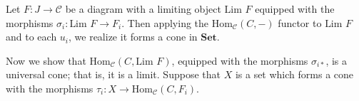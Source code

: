     \begin{prf}
        Let $F: J \to \mathcal{C}$ be a diagram with a limiting object  
        $\text{Lim } F$ equipped with the morphisms $\sigma_i: \text{Lim } F \to F_i$.
        Then applying the $\text{Hom}_{\mathcal{C}}(C, -)$ functor to $\text{Lim } F$ and to 
        each $u_i$, we realize it forms a cone in $\textbf{Set}$. 
        \begin{center}
        \end{center}
        Now we show that $\text{Hom}_{\mathcal{C}}(C, \text{Lim } F)$, equipped with the morphisms 
        $\sigma_{i*}$, is a universal cone; that is, it is a limit. 
        Suppose that $X$ is a set which forms a cone with the
        morphisms $\tau_i: X \to \text{Hom}_{\mathcal{C}}(C, F_i)$. 
        \begin{center}
        \end{center}
        

\end{prf}
